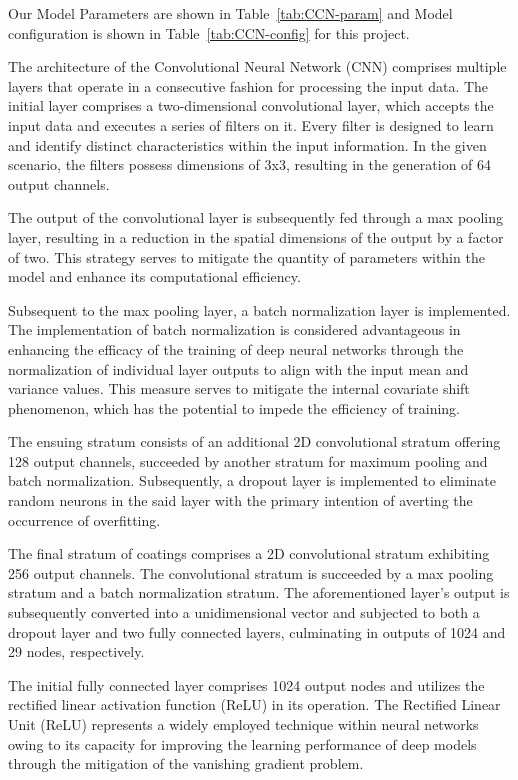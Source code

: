 \documentclass[conference]{IEEEtran}
\begin{document}
Our Model Parameters are shown in Table~\ref{tab:CCN-param} and Model configuration is shown in Table~\ref{tab:CCN-config} for this project. 

The architecture of the Convolutional Neural Network (CNN) comprises multiple layers that operate in a consecutive fashion for processing the input data. The initial layer comprises a two-dimensional convolutional layer, which accepts the input data and executes a series of filters on it. Every filter is designed to learn and identify distinct characteristics within the input information. In the given scenario, the filters possess dimensions of 3x3, resulting in the generation of 64 output channels.

The output of the convolutional layer is subsequently fed through a max pooling layer, resulting in a reduction in the spatial dimensions of the output by a factor of two. This strategy serves to mitigate the quantity of parameters within the model and enhance its computational efficiency.

Subsequent to the max pooling layer, a batch normalization layer is implemented. The implementation of batch normalization is considered advantageous in enhancing the efficacy of the training of deep neural networks through the normalization of individual layer outputs to align with the input mean and variance values. This measure serves to mitigate the internal covariate shift phenomenon, which has the potential to impede the efficiency of training.

The ensuing stratum consists of an additional 2D convolutional stratum offering 128 output channels, succeeded by another stratum for maximum pooling and batch normalization. Subsequently, a dropout layer is implemented to eliminate random neurons in the said layer with the primary intention of averting the occurrence of overfitting.

The final stratum of coatings comprises a 2D convolutional stratum exhibiting 256 output channels. The convolutional stratum is succeeded by a max pooling stratum and a batch normalization stratum. The aforementioned layer's output is subsequently converted into a unidimensional vector and subjected to both a dropout layer and two fully connected layers, culminating in outputs of 1024 and 29 nodes, respectively.

The initial fully connected layer comprises 1024 output nodes and utilizes the rectified linear activation function (ReLU) in its operation. The Rectified Linear Unit (ReLU) represents a widely employed technique within neural networks owing to its capacity for improving the learning performance of deep models through the mitigation of the vanishing gradient problem.
\end{document}
